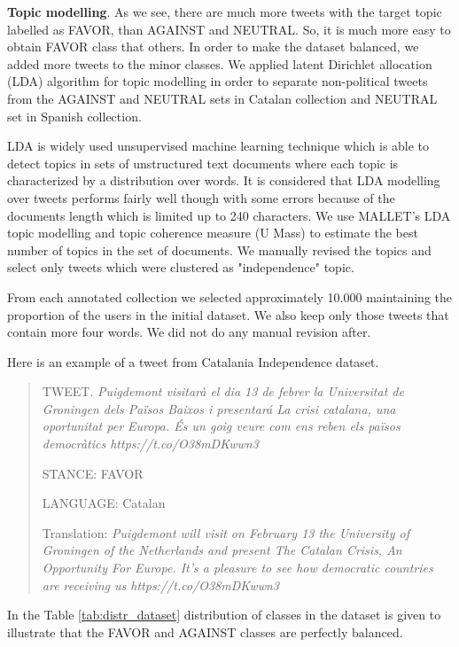 \documentclass[10pt, a4paper]{article}
\begin{document}
\textbf{Topic modelling}. As we see, there are much more tweets with the target topic labelled as FAVOR, than AGAINST and NEUTRAL. So, it is much more easy to obtain FAVOR class that others. In order to make the dataset balanced, we added more tweets to the minor classes. We applied latent Dirichlet allocation (LDA) \cite{Blei:2003:LDA:944919.944937} algorithm for topic modelling in order to separate non-political tweets from the AGAINST and NEUTRAL sets in Catalan collection and NEUTRAL set in Spanish collection. 

LDA is widely used unsupervised machine learning technique which is able to detect topics in sets of unstructured text documents where each topic is characterized by a distribution over words. It is considered that LDA modelling over tweets performs fairly well though with some errors because of the documents length which is limited up to 240 characters. We use MALLET's LDA \cite{McCallumMALLET} topic modelling and topic coherence measure (U Mass) to estimate the best number of topics in the set of documents. We manually revised the topics and select only tweets which were clustered  as "independence" topic. 

From each annotated collection we selected approximately 10.000 maintaining the proportion of the users in the initial dataset. We also keep only those tweets that contain more four words. We did not do any manual revision after.


Here is an example of a tweet from Catalania Independence dataset. 

\begin{quote}
TWEET. \textit{Puigdemont visitar\`a el dia 13 de febrer la Universitat de Groningen dels Pa\"isos Baixos i presentar\'a  La crisi catalana, una oportunitat per Europa. \'Es un goig veure com ens reben els pa\"isos democr\`atics https://t.co/O38mDKwwn3} 

STANCE: FAVOR 

LANGUAGE: Catalan

Translation: \textit{Puigdemont will visit
on February 13 the University of Groningen of the Netherlands and present The Catalan Crisis, An Opportunity For Europe.
It's a pleasure to see how democratic countries are receiving us https://t.co/O38mDKwwn3}
\end{quote}

In the Table \ref{tab:distr_dataset} distribution of classes in the dataset is given to illustrate that the FAVOR and AGAINST classes are perfectly balanced. 
\end{document}
